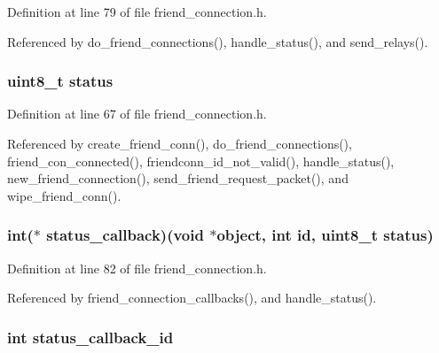 Definition at line 79 of file friend\+\_\+connection.\+h.



Referenced by do\+\_\+friend\+\_\+connections(), handle\+\_\+status(), and send\+\_\+relays().

\hypertarget{struct_friend___conn_ade818037fd6c985038ff29656089758d}{
\subsubsection[{status}]{\setlength{\rightskip}{0pt plus 5cm}uint8\+\_\+t status}}\label{struct_friend___conn_ade818037fd6c985038ff29656089758d}


Definition at line 67 of file friend\+\_\+connection.\+h.



Referenced by create\+\_\+friend\+\_\+conn(), do\+\_\+friend\+\_\+connections(), friend\+\_\+con\+\_\+connected(), friendconn\+\_\+id\+\_\+not\+\_\+valid(), handle\+\_\+status(), new\+\_\+friend\+\_\+connection(), send\+\_\+friend\+\_\+request\+\_\+packet(), and wipe\+\_\+friend\+\_\+conn().

\hypertarget{struct_friend___conn_a5b3bbefec1bad16d4dbacabf34692bd6}{
\subsubsection[{status\+\_\+callback}]{\setlength{\rightskip}{0pt plus 5cm}int($\ast$ status\+\_\+callback)(void $\ast$object, int id, uint8\+\_\+t {\bf status})}}\label{struct_friend___conn_a5b3bbefec1bad16d4dbacabf34692bd6}


Definition at line 82 of file friend\+\_\+connection.\+h.



Referenced by friend\+\_\+connection\+\_\+callbacks(), and handle\+\_\+status().

\hypertarget{struct_friend___conn_a374df80da5cf3057d7c3743afadb2596}{
\subsubsection[{status\+\_\+callback\+\_\+id}]{\setlength{\rightskip}{0pt plus 5cm}int status\+\_\+callback\+\_\+id}}\label{struct_friend___conn_a374df80da5cf3057d7c3743afadb2596}


